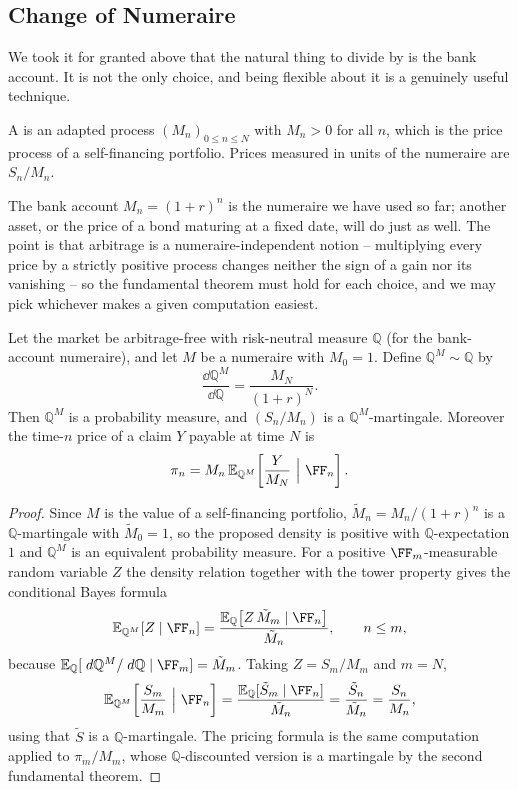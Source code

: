 \documentclass[a4paper]{scrartcl}
\newcommand{\QQ}{\mathbb{Q}}
\begin{document}
\subsection{Change of Numeraire}

We took it for granted above that the natural thing to divide by is the bank account. It is not the only choice, and being flexible about it is a genuinely useful technique.

\begin{definition}[Numeraire]
	A  is an adapted process $(M_n)_{0\leq n\leq N}$ with $M_n > 0$ for all $n$, which is the price process of a self-financing portfolio. Prices measured in units of the numeraire are $S_n/M_n$.
\end{definition}

The bank account $M_n = (1+r)^n$ is the numeraire we have used so far; another asset, or the price of a bond maturing at a fixed date, will do just as well. The point is that arbitrage is a numeraire-independent notion -- multiplying every price by a strictly positive process changes neither the sign of a gain nor its vanishing -- so the fundamental theorem must hold for each choice, and we may pick whichever makes a given computation easiest.

\begin{theorem}\label{thm:numeraire}
	Let the market be arbitrage-free with risk-neutral measure $\QQ$ (for the bank-account numeraire), and let $M$ be a numeraire with $M_0 = 1$. Define $\QQ^M \sim \QQ$ by
	$$
	\frac{\dd\QQ^M}{\dd\QQ} = \frac{M_N}{(1+r)^{N}}.
	$$
	Then $\QQ^M$ is a probability measure, and $(S_n/M_n)$ is a $\QQ^M$-martingale. Moreover the time-$n$ price of a claim $Y$ payable at time $N$ is
	$$
	\pi_n = M_n\,\EE_{\QQ^M}\!\left[\frac{Y}{M_N}\ \Big|\ \FF_n\right].
	$$
\end{theorem}

\begin{proof}
	Since $M$ is the value of a self-financing portfolio, $\tilde M_n = M_n/(1+r)^n$ is a $\QQ$-martingale with $\tilde M_0 = 1$, so the proposed density is positive with $\QQ$-expectation $1$ and $\QQ^M$ is an equivalent probability measure. For a positive $\FF_m$-measurable random variable $Z$ the density relation together with the tower property gives the conditional Bayes formula
	$$
	\EE_{\QQ^M}[Z \mid \FF_n] = \frac{\EE_\QQ\big[Z\,\tilde M_m\mid\FF_n\big]}{\tilde M_n}, \qquad n \leq m,
	$$
	because $\EE_\QQ[\dd\QQ^M/\dd\QQ \mid \FF_m] = \tilde M_m$. Taking $Z = S_m/M_m$ and $m = N$,
	$$
	\EE_{\QQ^M}\!\left[\frac{S_m}{M_m}\ \Big|\ \FF_n\right] = \frac{\EE_\QQ[\tilde S_m\mid\FF_n]}{\tilde M_n} = \frac{\tilde S_n}{\tilde M_n} = \frac{S_n}{M_n},
	$$
	using that $\tilde S$ is a $\QQ$-martingale. The pricing formula is the same computation applied to $\pi_m/M_m$, whose $\QQ$-discounted version is a martingale by the second fundamental theorem.
\end{proof}
\end{document}

